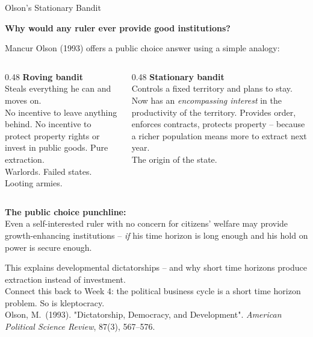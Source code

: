 \documentclass[10pt]{beamer}
\begin{document}
\begin{frame}[allowframebreaks]{Olson's Stationary Bandit}

\textbf{Why would any ruler ever provide good institutions?}


Mancur Olson (1993) offers a public choice answer using a simple analogy:


\begin{columns}[T]
\begin{column}{0.48\textwidth}
\textbf{\color{myOrange} Roving bandit}\\[6pt]
Steals everything he can and moves on.\\[4pt]
\footnotesize No incentive to leave anything behind. No incentive to protect property rights or invest in public goods. Pure extraction.\\[4pt]
\alert{Warlords. Failed states. Looting armies.}
\end{column}
\begin{column}{0.48\textwidth}
\textbf{\color{myTeal} Stationary bandit}\\[6pt]
Controls a fixed territory and plans to stay.\\[4pt]
\footnotesize Now has an \emph{encompassing interest} in the productivity of the territory. Provides order, enforces contracts, protects property -- because a richer population means more to extract next year.\\[4pt]
\alert{The origin of the state.}
\end{column}
\end{columns}


\textbf{The public choice punchline:}\\
Even a self-interested ruler with no concern for citizens' welfare may provide growth-enhancing institutions -- \emph{if} his time horizon is long enough and his hold on power is secure enough.


\alert{This explains developmental dictatorships -- and why short time horizons produce extraction instead of investment.}\\[3pt]
\footnotesize Connect this back to Week 4: the political business cycle is a short time horizon problem. So is kleptocracy.\\[3pt]
Olson, M.\ (1993). "Dictatorship, Democracy, and Development". \emph{American Political Science Review}, 87(3), 567--576.
\end{frame}
\end{document}
